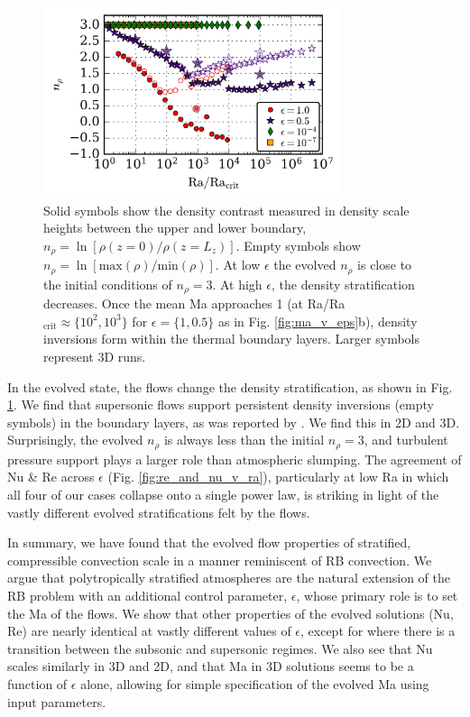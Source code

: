\documentclass[aps, prl, twocolumn, nofootinbib, groupedaddress, amsfonts, amssymb, amsmath]{revtex4-1}
\begin{document}
\begin{figure}[t]
\includegraphics[width=3.4375in]{./figs/density_v_ra.png}
\caption{\label{fig:nrho_v_ra} 
Solid symbols show the density contrast measured
in density scale heights between the upper and lower boundary, 
$n_\rho = \ln[\rho(z=0)/\rho(z=L_z)]$.
Empty symbols show 
$n_\rho = \ln[\text{max}(\rho)/\text{min}(\rho)]$. 
At low $\epsilon$ the evolved
$n_{\rho}$ is close to the initial conditions of $n_\rho = 3$.  
At high $\epsilon$,
the density stratification decreases.  Once the mean 
Ma approaches 1 (at Ra/Ra$_{\text{crit}} \approx \{10^2, 10^3\}$ for $\epsilon = \{1, 0.5\}$
as in Fig. \ref{fig:ma_v_eps}b), density inversions form within the thermal
boundary layers. Larger symbols represent 3D runs.}
\end{figure}

In the evolved state, the flows change the density stratification,
as shown in Fig. \ref{fig:nrho_v_ra}.
We find that supersonic flows support persistent density inversions (empty symbols)
in the boundary layers, as
was reported by \cite{brandenburg&all2005}.  We find this in 2D and 3D.
Surprisingly, the evolved $n_\rho$ is always less than the initial $n_\rho = 3$,
and turbulent pressure support plays a larger role than atmospheric slumping.
The agreement of Nu \& Re across $\epsilon$ (Fig. \ref{fig:re_and_nu_v_ra}), 
particularly at low Ra in which all four of our cases collapse onto a single
power law, is striking in light of the vastly different evolved stratifications
felt by the flows. 


In summary, we have found that the evolved flow properties of stratified,
compressible convection scale in a manner reminiscent of RB convection.
We argue that polytropically stratified atmospheres are the natural
extension of the RB problem with an additional control parameter, $\epsilon$,
whose primary role is to set the Ma of the flows.  We show that other properties
of the evolved solutions (Nu, Re) are nearly identical at vastly different values
of $\epsilon$, except for where there is a transition between the subsonic
and supersonic regimes.  We also see that Nu scales similarly in 3D and 2D,
and that Ma in 3D solutions seems to be a function of $\epsilon$ alone,
allowing for simple specification of the evolved Ma using input parameters.
\end{document}
